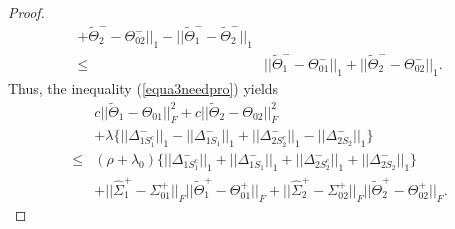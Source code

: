 \documentclass[review]{elsarticle}
\newcommand{\1}{{\bf 1}}
\newcommand{\0}{{\bf 0}}
\newtheorem{proof}{Proof}
\begin{document}
\begin{appendices}
\begin{proof}
\begin{equation}
\begin{split}
+\widetilde{\Theta}_2^{-}
-\Theta_{02}^{-}||_1-||\widetilde{\Theta}_1^{-}-\widetilde{\Theta}_2^{-}||_1\\
\leq& ||\widetilde{\Theta}_1^{-}-\Theta_{01}^{-}||_1+||\widetilde{\Theta}_2^{-}
-\Theta_{02}^{-}||_1.
\end{split}
\end{equation}
 Thus, the inequality (\ref{equa3needpro}) yields
\begin{equation}
\begin{split}
&c||\widetilde{\Theta}_1-\Theta_{01}||_{F}^{2}+c||\widetilde{\Theta}_2-\Theta_{02}||_{F}^{2} \\
&+\lambda\Big\{||\Delta_{1S_1^{c}}^{-}||_1-||\Delta_{1S_1}^{-}||_1+||\Delta_{2S_2^{c}}^{-}||_1-||\Delta_{2S_2}^{-}||_1\Big\}\\
\leq &(\rho+\lambda_0)\Big\{||\Delta_{1S_1^{c}}^{-}||_1+||\Delta_{1S_1}^{-}||_1+||\Delta_{2S_2^{c}}^{-}||_1+||\Delta_{2S_2}^{-}||_1\Big\}\\
&+||\widehat{\Sigma}_{1}^{+}-\Sigma_{01}^{+}||_F||\widetilde{\Theta}_1^{+}-\Theta_{01}^{+}||_{F}
+||\widehat{\Sigma}_{2}^{+}-\Sigma_{02}^{+}||_F||\widetilde{\Theta}_2^{+}-\Theta_{02}^{+}||_{F}.
\end{split}
\end{equation}


\end{proof}
\end{appendices}
\end{document}
